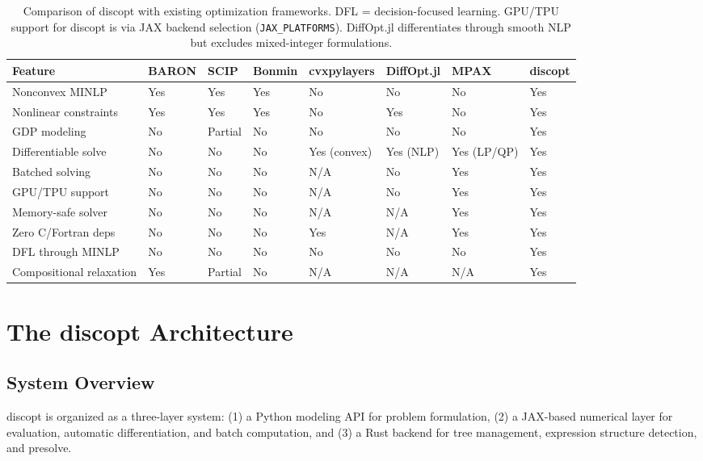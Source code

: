\documentclass[12pt,preprint]{article}
\begin{document}
\begin{table}[htbp]
\centering
\begin{tabular}{llllllll}
\toprule
Feature & BARON & SCIP & Bonmin & cvxpylayers & DiffOpt.jl & MPAX & discopt \\
\midrule
Nonconvex MINLP & Yes & Yes & Yes & No & No & No & Yes \\
Nonlinear constraints & Yes & Yes & Yes & No & Yes & No & Yes \\
GDP modeling & No & Partial & No & No & No & No & Yes \\
Differentiable solve & No & No & No & Yes (convex) & Yes (NLP) & Yes (LP/QP) & Yes \\
Batched solving & No & No & No & N/A & No & Yes & Yes \\
GPU/TPU support & No & No & No & N/A & No & Yes & Yes \\
Memory-safe solver & No & No & No & N/A & N/A & Yes & Yes \\
Zero C/Fortran deps & No & No & No & Yes & N/A & Yes & Yes \\
DFL through MINLP & No & No & No & No & No & No & Yes \\
Compositional relaxation & Yes & Partial & No & N/A & N/A & N/A & Yes \\
\bottomrule
\end{tabular}
\caption{Comparison of discopt with existing optimization frameworks. DFL = decision-focused learning. GPU/TPU support for discopt is via JAX backend selection (\texttt{JAX\_PLATFORMS}). DiffOpt.jl differentiates through smooth NLP but excludes mixed-integer formulations.}
\label{tab-gaps}
\end{table}


\section{The discopt Architecture}
\label{org-the-discopt-architecture}
\subsection{System Overview}
\label{org-system-overview}
discopt is organized as a three-layer system: (1) a Python modeling API for problem formulation, (2) a JAX-based numerical layer for evaluation, automatic differentiation, and batch computation, and (3) a Rust backend for tree management, expression structure detection, and presolve.
\end{document}
